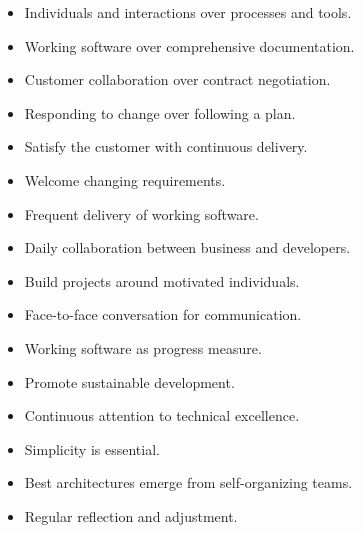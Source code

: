 \documentclass[10pt]{article}
\begin{document}
\begin{multicols}{5}
\begin{block}
    \begin{itemize}
        \item Individuals and interactions over processes and tools.
        \item Working software over comprehensive documentation.
        \item Customer collaboration over contract negotiation.
        \item Responding to change over following a plan.
    \end{itemize}
\end{block}

\begin{block}
    \begin{itemize}
        \item Satisfy the customer with continuous delivery.
        \item Welcome changing requirements.
        \item Frequent delivery of working software.
        \item Daily collaboration between business and developers.
        \item Build projects around motivated individuals.
        \item Face-to-face conversation for communication.
        \item Working software as progress measure.
        \item Promote sustainable development.
        \item Continuous attention to technical excellence.
        \item Simplicity is essential.
        \item Best architectures emerge from self-organizing teams.
        \item Regular reflection and adjustment.
    \end{itemize}
\end{block}


\end{multicols}
\end{document}
